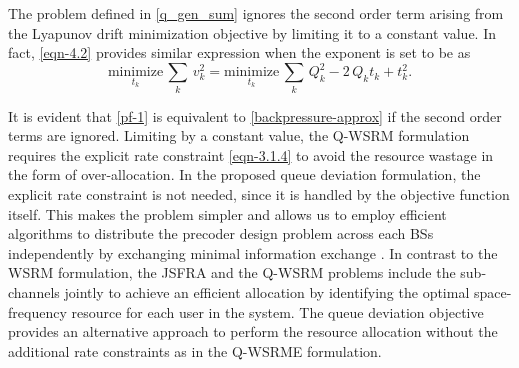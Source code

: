 The problem defined in \eqref{q_gen_sum} ignores the second order term arising from the Lyapunov drift minimization objective by limiting it to a constant value. In fact, \eqref{eqn-4.2} provides similar expression when the exponent is set to be  as
\begin{equation}\label{pf-1}
\underset{t_k}{\text{minimize}} \, \sum_k \, v_k^2 = \underset{t_k}{\text{minimize}} \, \sum_k \, Q_k^2 - 2 \, Q_k t_k + t_k^2.
\end{equation}

It is evident that \eqref{pf-1} is equivalent to \eqref{backpressure-approx} if the second order terms are ignored. Limiting  by a constant value, the \ac{Q-WSRM} formulation requires the explicit rate constraint \eqref{eqn-3.1.4} to avoid the resource wastage in the form of over-allocation. In the proposed queue deviation formulation, the explicit rate constraint is not needed, since it is handled by the objective function itself. This makes the problem simpler and allows us to employ efficient algorithms to distribute the precoder design problem across each \acp{BS} independently by exchanging minimal information exchange \cite{boyd2011distributed}. In contrast to the \ac{WSRM} formulation, the \ac{JSFRA} and the \ac{Q-WSRM} problems include the sub-channels jointly to achieve an efficient allocation by identifying the optimal space-frequency resource for each user in the system. The queue deviation objective provides an alternative approach to perform the resource allocation without the additional rate constraints as in the \ac{Q-WSRME} formulation.
